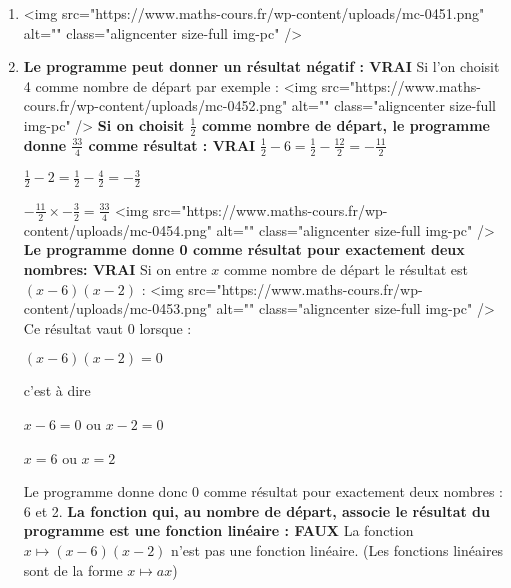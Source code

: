 \begin{corrige}
     \begin{enumerate}
          \item
          <img src="https://www.maths-cours.fr/wp-content/uploads/mc-0451.png" alt="" class="aligncenter size-full  img-pc" />
          \item
          \textbf{Le programme peut donner un résultat négatif : VRAI}
          Si l'on choisit 4 comme nombre de départ par exemple :
          <img src="https://www.maths-cours.fr/wp-content/uploads/mc-0452.png" alt="" class="aligncenter size-full  img-pc" />
          \textbf{Si on choisit $\frac{1}{2}$ comme nombre de départ, le programme donne $\frac{33}{4}$ comme résultat : VRAI}
          $\frac{1}{2}-6=\frac{1}{2}-\frac{12}{2}=-\frac{11}{2}$
          \par
          $\frac{1}{2}-2=\frac{1}{2}-\frac{4}{2}=-\frac{3}{2}$
          \par
          $-\frac{11}{2}\times -\frac{3}{2}=\frac{33}{4}$
          <img src="https://www.maths-cours.fr/wp-content/uploads/mc-0454.png" alt="" class="aligncenter size-full  img-pc" />
          \textbf{Le programme donne 0 comme résultat pour exactement deux nombres: VRAI}
          Si on entre $x$ comme nombre de départ le résultat est $\left(x-6\right)\left(x-2\right)$ :
          <img src="https://www.maths-cours.fr/wp-content/uploads/mc-0453.png" alt="" class="aligncenter size-full  img-pc" />
          Ce résultat vaut $0$ lorsque :
          \par
          $\left(x-6\right)\left(x-2\right)=0$
          \par
          c'est à dire
          \par
          $x-6=0$ ou $x-2=0$
          \par
          $x=6$ ou $x=2$
          \par
          Le programme donne  donc 0 comme résultat pour exactement deux nombres : 6 et 2.
          \textbf{La fonction qui, au nombre de départ, associe le résultat du programme est une fonction linéaire : FAUX}
          La fonction $x\mapsto \left(x-6\right)\left(x-2\right)$ n'est pas une fonction linéaire. (Les fonctions linéaires sont de la forme $x\mapsto ax$)
     \end{enumerate}
\end{corrige}
